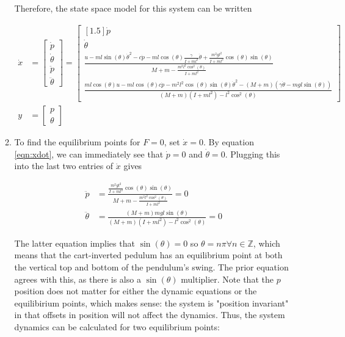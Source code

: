 \documentclass[11pt]{article}
\theoremstyle{definition}
\begin{document}
\begin{enumerate}
\begin{enumerate}
        Therefore, the state space model for this system can be written

        \begin{align}
            \dot{x} &= \begin{bmatrix} \dot{p} \\ \dot{\theta} \\ \ddot{p} \\ \ddot{\theta} \end{bmatrix} = \begin{bmatrix}[1.5] \dot{p} \\ \dot{\theta} \\ \frac{u - ml \sin(\theta) \dot{\theta}^2 - c \dot{p} - ml \cos(\theta) \frac{\gamma}{I + ml^2} \dot{\theta} + \frac{ m^2 g l^2}{I + ml^2} \cos (\theta) \sin (\theta)}{M + m - \frac{m^2 l^2 \cos^2 (\theta)}{I + ml^2}} \\  \frac{ml \cos (\theta)u - ml \cos (\theta) c \dot{p} - m^2 l^2 \cos (\theta) \sin (\theta) \dot{\theta}^2 - (M + m)(\gamma \dot{\theta} - mgl \sin (\theta))}{(M + m)(I + ml^2) - l^2 \cos^2(\theta)} \end{bmatrix} \label{eqn:xdot}\\
            y &= \begin{bmatrix} p \\ \theta \end{bmatrix}
        \end{align}

        \item %
        To find the equilibrium points for $F = 0$, set $\dot{x} = 0$.  By equation \ref{eqn:xdot}, we can immediately see that $\dot{p} = 0$ and $\dot{\theta} = 0$.  Plugging this into the last two entries of $\dot{x}$ gives

        \begin{align}
            \ddot{p} &= \frac{\frac{ m^2 g l^2}{I + ml^2} \cos (\theta) \sin (\theta)}{M + m - \frac{m^2 l^2 \cos^2 (\theta)}{I + ml^2}} = 0 \\
            \ddot{\theta} &= \frac{(M + m) mgl \sin (\theta)}{(M + m)(I + ml^2) - l^2 \cos^2(\theta)} = 0
        \end{align}

        The latter equation implies that $\sin (\theta) = 0$ so $\theta  = n \pi \forall n \in \mathbb{Z}$, which means that the cart-inverted pedulum has an equilibrium point at both the vertical top and bottom of the pendulum's swing.  The prior equation agrees with this, as there is also a $\sin (\theta)$ multiplier.  Note that the $p$ position does not matter for either the dynamic equations or the equilibirium points, which makes sense: the system is "position invariant" in that offsets in position will not affect the dynamics.  Thus, the system dynamics can be calculated for two equilibrium points:


\end{enumerate}
\end{enumerate}
\end{document}
